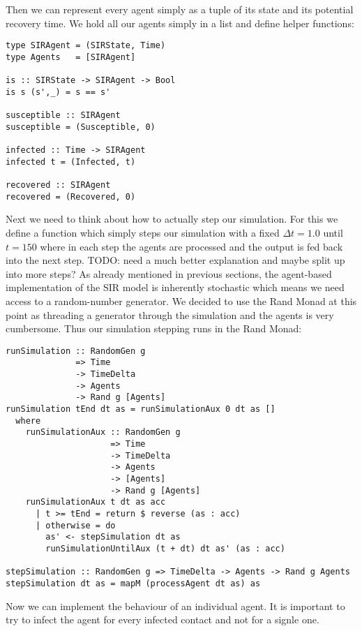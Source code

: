 Then we can represent every agent simply as a tuple of its state and its potential recovery time. We hold all our agents simply in a list and define helper functions:
\begin{verbatim}
type SIRAgent = (SIRState, Time)
type Agents   = [SIRAgent]

is :: SIRState -> SIRAgent -> Bool
is s (s',_) = s == s'

susceptible :: SIRAgent
susceptible = (Susceptible, 0)

infected :: Time -> SIRAgent
infected t = (Infected, t)

recovered :: SIRAgent
recovered = (Recovered, 0)
\end{verbatim}

Next we need to think about how to actually step our simulation. For this we define a function which simply steps our simulation with a fixed $\Delta t = 1.0$ until $t = 150$ where in each step the agents are processed and the output is fed back into the next step.
TODO: need a much better explanation and maybe split up into more steps?
As already mentioned in previous sections, the agent-based implementation of the SIR model is inherently stochastic which means we need access to a random-number generator. We decided to use the Rand Monad at this point as threading a generator through the simulation and the agents is very cumbersome. Thus our simulation stepping runs in the Rand Monad:

\begin{verbatim}
runSimulation :: RandomGen g 
              => Time 
              -> TimeDelta 
              -> Agents 
              -> Rand g [Agents]
runSimulation tEnd dt as = runSimulationAux 0 dt as []
  where
    runSimulationAux :: RandomGen g 
                     => Time 
                     -> TimeDelta 
                     -> Agents 
                     -> [Agents] 
                     -> Rand g [Agents]
    runSimulationAux t dt as acc
      | t >= tEnd = return $ reverse (as : acc)
      | otherwise = do
        as' <- stepSimulation dt as 
        runSimulationUntilAux (t + dt) dt as' (as : acc)

stepSimulation :: RandomGen g => TimeDelta -> Agents -> Rand g Agents
stepSimulation dt as = mapM (processAgent dt as) as
\end{verbatim}

Now we can implement the behaviour of an individual agent.
It is important to try to infect the agent for every infected contact and not for a signle one.

